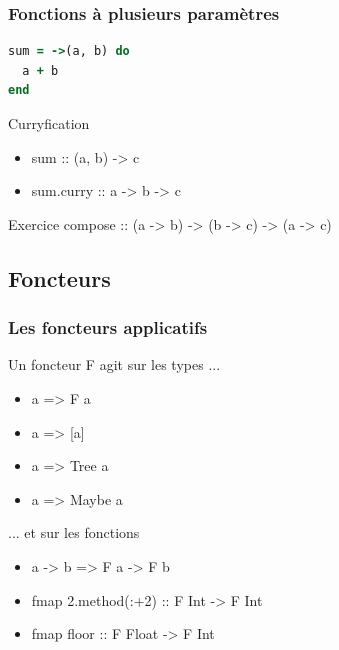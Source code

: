 \documentclass{beamer}
\begin{document}
\begin{frame}[fragile]
\frametitle{Fonctions à plusieurs paramètres}
\begin{block}{}
\begin{lstlisting}[language=ruby,basicstyle=\ttfamily,keywordstyle=\color{red}]
sum = ->(a, b) do
  a + b
end
\end{lstlisting}
\end{block}
\begin{block}{Curryfication}
\begin{itemize}
\item sum :: (a, b) -> c
\item sum.curry :: a -> b -> c
\end{itemize}
\end{block}
\pause
\begin{block}{Exercice}
compose :: (a -> b) -> (b -> c) -> (a -> c)
\end{block}
\end{frame}

\subsection{Foncteurs}


\begin{frame}
\frametitle{Les foncteurs applicatifs}
\begin{block}{Un foncteur F agit sur les types ...}
\begin{itemize}
\item a => F a
\end{itemize}
\end{block}
\begin{exampleblock}{}
\begin{itemize}
\item a => [a]
\item a => Tree a
\item a => Maybe a
\end{itemize}
\end{exampleblock}

\pause

\begin{block}{... et sur les fonctions}
\begin{itemize}
\item a -> b => F a -> F b
\end{itemize}
\end{block}

\begin{exampleblock}{}
\begin{itemize}
\item fmap 2.method(:+2) :: F Int -> F Int
\item fmap floor :: F Float -> F Int
\end{itemize}
\end{exampleblock}
\end{frame}
\end{document}
